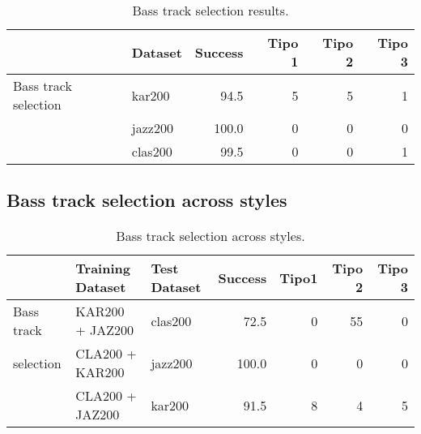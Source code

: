 \documentclass{llncs}
\begin{document}
\begin{table}
\begin{center}
\begin{tabular}{ l | l | r | r | r | r }
\hline
   &   Dataset \hspace{0.5cm} &  \hspace{0.5cm} Success & \hspace{0.2cm} Tipo 1 & \hspace{0.2cm} Tipo 2 & \hspace{0.2cm} Tipo 3 \\
\hline
\hline
Bass track selection    &   kar200 	&	 94.5 	&	 5 	&	 5 	&	 1 	 \\
                        &   jazz200 	&	 100.0 	&	 0 	&	 0 	&	 0 	 \\
                        &   clas200 	&	 99.5 	&	 0 	&	 0 	&	 1 	 \\
\hline
\end{tabular}
\caption{Bass track selection results.}
\label{result2}
\end{center}
\end{table}



\subsection{Bass track selection across styles}
\begin{table}
\begin{center}
\begin{tabular}{ l | l | l | r | r | r | r }
\hline
& Training Dataset  & Test Dataset    &  Success & Tipo1 & Tipo 2 & Tipo 3 \\
\hline
\hline
Bass track     &   KAR200 + JAZ200  &   clas200 	& 72.5 	& 0 	& 55 	& 0 	 \\
selection      &   CLA200 + KAR200  &   jazz200 	& 100.0 & 0 	& 0 	& 0 	 \\
               &   CLA200 + JAZ200  &   kar200 		& 91.5 	& 8 	& 4 	& 5 	 \\
\hline
\end{tabular}
\caption{Bass track selection  across styles.}
\label{result3}
\end{center}
\end{table}




\end{document}

